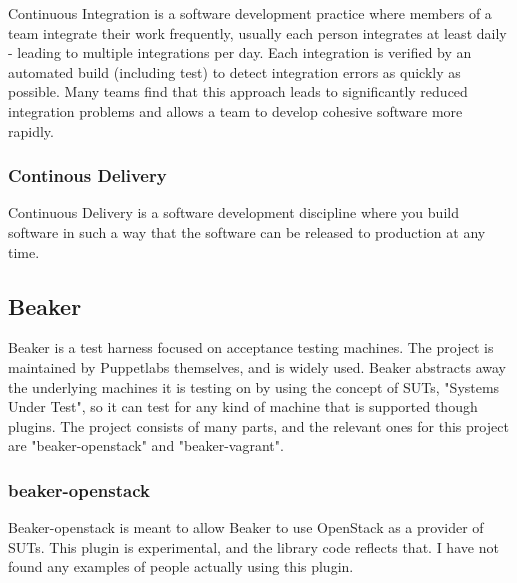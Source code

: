 Continuous Integration is a software development practice where members of a team integrate their work frequently, usually each person integrates at least daily - leading to multiple integrations per day. Each integration is verified by an automated build (including test) to detect integration errors as quickly as possible. Many teams find that this approach leads to significantly reduced integration problems and allows a team to develop cohesive software more rapidly.

\subsubsection{Continous Delivery}


Continuous Delivery is a software development discipline where you build software in such a way that the software can be released to production at any time.

\subsection{Beaker}

Beaker is a test harness focused on acceptance testing machines. The project is maintained by Puppetlabs themselves, and is widely used. Beaker abstracts away the underlying machines it is testing on by using the concept of SUTs, "Systems Under Test", so it can test for any kind of machine that is supported though plugins. The project consists of many parts, and the relevant ones for this project are "beaker-openstack" and "beaker-vagrant".



\subsubsection{beaker-openstack}

Beaker-openstack is meant to allow Beaker to use OpenStack as a provider of SUTs. This plugin is experimental, and the library code reflects that. I have not found any examples of people actually using this plugin.


